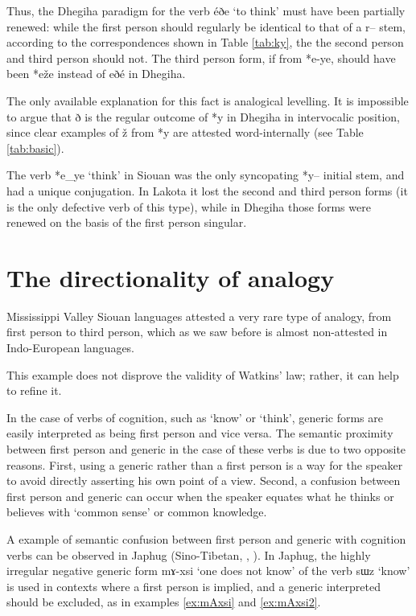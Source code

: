 \documentclass[oldfontcommands,oneside,a4paper,11pt]{article}
\newcommand{\ipa}[1]{{\phon#1}} %
\begin{document}
 Thus, the Dhegiha paradigm for the verb \ipa{éðe} `to think' must have been partially renewed: while the first person should regularly be identical to that of a \ipa{r--} stem, according to the correspondences shown in Table \ref{tab:ky}, the the second person and third person should not. The third person form, if from *\ipa{e-ye}, should have been *\ipa{eže} instead of \ipa{eðé} in Dhegiha.

The only available explanation for this fact is analogical levelling. It is impossible to argue that \ipa{ð} is the regular outcome of *\ipa{y} in Dhegiha in intervocalic position, since clear examples of \ipa{ž} from *\ipa{y} are attested word-internally (see Table \ref{tab:basic}).

The verb *\ipa{e\_ye} `think' in Siouan was the only syncopating *\ipa{y--} initial stem, and had a unique conjugation. In Lakota it lost the second and third person forms (it is the only defective verb of this type), while in Dhegiha those forms were renewed on the basis of the first person singular.


\section{The directionality of analogy}

Mississippi Valley Siouan languages attested a very rare type of analogy, from first person to third person, which as we saw before is almost non-attested in Indo-European languages.

This example does not disprove the validity of Watkins' law; rather, it can help to refine it. 

In the case of verbs of cognition, such as `know' or `think',  generic forms are easily interpreted as being first person and vice versa. The semantic proximity between first person and generic in the case of these verbs is due to two opposite reasons. First, using a generic rather than a first person is a way for the speaker to avoid directly asserting his own point of a view. Second, a confusion between first person and generic can occur when the speaker equates what he thinks or believes with `common sense' or common knowledge.


A example of semantic confusion between first person and generic with cognition verbs can be observed  in Japhug (Sino-Tibetan, \citealt[342]{jacques04these}, \citealt{jacques15generic}). In Japhug, the highly irregular negative generic form \ipa{mɤ-xsi} `one does not know' of the verb \ipa{sɯz} `know' is used in contexts where a first person is  implied, and a generic interpreted should be excluded, as in examples \ref{ex:mAxsi} and \ref{ex:mAxsi2}.
\end{document}
